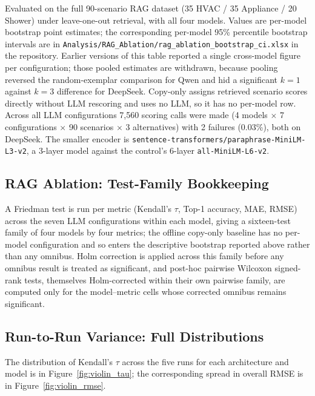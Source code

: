 \documentclass[11pt]{article}
\begin{document}
Evaluated on the full 90-scenario RAG dataset (35 HVAC / 35 Appliance / 20 Shower) under leave-one-out retrieval, with all four models. Values are per-model bootstrap point estimates; the corresponding per-model 95\% percentile bootstrap intervals are in \texttt{Analysis/RAG\_Ablation/rag\_ablation\_bootstrap\_ci.xlsx} in the repository. Earlier versions of this table reported a single cross-model figure per configuration; those pooled estimates are withdrawn, because pooling reversed the random-exemplar comparison for Qwen and hid a significant $k{=}1$ against $k{=}3$ difference for DeepSeek. Copy-only assigns retrieved scenario scores directly without LLM rescoring and uses no LLM, so it has no per-model row. Across all LLM configurations 7,560 scoring calls were made (4 models $\times$ 7 configurations $\times$ 90 scenarios $\times$ 3 alternatives) with 2 failures (0.03\%), both on DeepSeek. The smaller encoder is \texttt{sentence-transformers/paraphrase-MiniLM-L3-v2}, a 3-layer model against the control's 6-layer \texttt{all-MiniLM-L6-v2}.

\subsection{RAG Ablation: Test-Family Bookkeeping}
\label{app:rag_ablation_significance}

A Friedman test is run per metric (Kendall's $\tau$, Top-1 accuracy, MAE, RMSE) across the seven LLM configurations within each model, giving a sixteen-test family of four models by four metrics; the offline copy-only baseline has no per-model configuration and so enters the descriptive bootstrap reported above rather than any omnibus. Holm correction is applied across this family before any omnibus result is treated as significant, and post-hoc pairwise Wilcoxon signed-rank tests, themselves Holm-corrected within their own pairwise family, are computed only for the model--metric cells whose corrected omnibus remains significant.

\subsection{Run-to-Run Variance: Full Distributions}
\label{app:variance}

The distribution of Kendall's $\tau$ across the five runs for each architecture and model is in Figure~\ref{fig:violin_tau}; the corresponding spread in overall RMSE is in Figure~\ref{fig:violin_rmse}.
\end{document}
